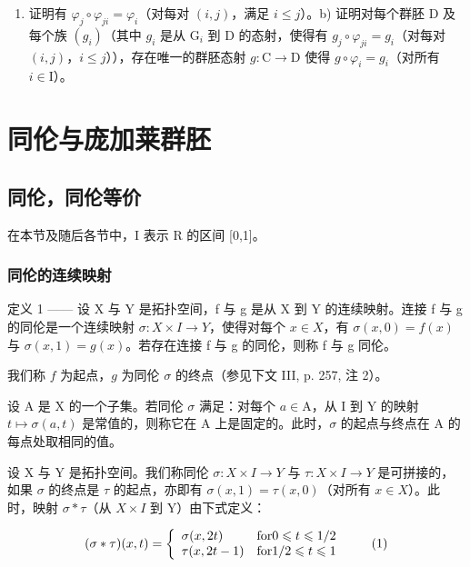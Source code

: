 \begin{enumerate}
\def\labelenumi{\alph{enumi})}
\tightlist
\item
  证明有 \(\varphi_j \circ \varphi_{ji} = \varphi_i\)（对每对 \((i,j)\)，满足 \(i \leqslant j\)）。b) 证明对每个群胚 D 及每个族 \((g_i)\)（其中 \(g_i\) 是从 \(\mathrm{G}_i\) 到 D 的态射，使得有 \(g_j \circ \varphi_{ji} = g_i\)（对每对 \((i,j)\)，\(i \leqslant j\)）），存在唯一的群胚态射 \(g: \mathrm{C} \to \mathrm{D}\) 使得 \(g \circ \varphi_i = g_i\)（对所有 \(i \in \mathrm{I}\)）。
\end{enumerate}

\chapter{同伦与庞加莱群胚}

\section{同伦，同伦等价}

在本节及随后各节中，I 表示 R 的区间 {[}0,1{]}。

\subsection{同伦的连续映射}

定义 1 —— 设 X 与 Y 是拓扑空间，f 与 g 是从 X 到 Y 的连续映射。连接 f 与 g 的同伦是一个连续映射 \(\sigma: X \times I \to Y\)，使得对每个 \(x \in X\)，有 \(\sigma(x,0) = f(x)\) 与 \(\sigma(x,1) = g(x)\)。若存在连接 f 与 g 的同伦，则称 f 与 g 同伦。

我们称 \(f\) 为起点，\(g\) 为同伦 \(\sigma\) 的终点（参见下文 III, p. 257, 注 2）。

设 A 是 X 的一个子集。若同伦 \(\sigma\) 满足：对每个 \(a \in \mathrm{A}\)，从 I 到 Y 的映射 \(t \mapsto \sigma(a, t)\) 是常值的，则称它在 A 上是固定的。此时，\(\sigma\) 的起点与终点在 A 的每点处取相同的值。

设 X 与 Y 是拓扑空间。我们称同伦 \(\sigma\colon X\times I\to Y\) 与 \(\tau\colon X\times I\to Y\) 是可拼接的，如果 \(\sigma\) 的终点是 \(\tau\) 的起点，亦即有 \(\sigma(x,1)=\tau(x,0)\)（对所有 \(x\in X\)）。此时，映射 \(\sigma*\tau\)（从 \(X\times I\) 到 Y）由下式定义：

\[
(\sigma * \tau) (x, t) = \left\{ \begin{array}{l l} \sigma (x, 2 t) & \text {for} 0 \leqslant t \leqslant 1 / 2 \\ \tau (x, 2 t - 1) & \text {for} 1 / 2 \leqslant t \leqslant 1 \end{array} \right.\tag{1}
\]

